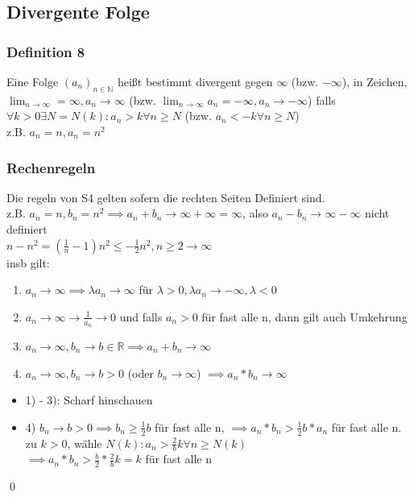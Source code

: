 \documentclass[fleqn]{scrartcl}
\renewenvironment{proof}{{\bfseries Beweis }}{\qed}
\begin{document}
\subsection{Divergente Folge}
\subsubsection{Definition 8} Eine Folge $(a_n)_{n \in \mathbb{N}}$ heißt bestimmt divergent gegen $\infty$ (bzw. $-\infty$), in Zeichen, $\lim_{n\rightarrow \infty} = \infty, a_n \rightarrow \infty$ (bzw. $\lim_{n\rightarrow\infty} a_n = - \infty , a_n \rightarrow - \infty$) falls $\forall k > 0 \exists N = N(k): a_n > k \forall n \geq N$ (bzw. $a_n < -k \forall n \geq N$)\\
z.B. $a_n = n, a_n = n^2$
\subsubsection{Rechenregeln} Die regeln von S4 gelten sofern die rechten Seiten Definiert sind.\\
z.B. $a_n = n, b_n = n^2 \implies a_n + b_n \rightarrow \infty + \infty = \infty$, also $a_n - b_n \rightarrow \infty - \infty$ nicht definiert\\
$n - n^2 = (\frac{1}{n} - 1) n^2 \leq -\frac{1}{2}n^2, n\geq 2 \rightarrow \infty$\\
insb gilt:
\begin{enumerate}[1)]
\item $a_n \rightarrow \infty \implies \lambda a_n \rightarrow \infty$ für $\lambda > 0, \lambda a_n \rightarrow - \infty, \lambda < 0$
\item $a_n \rightarrow \infty \rightarrow \frac{1}{a_n} \rightarrow 0$ und falls $a_n > 0$ für fast alle n, dann gilt auch Umkehrung
\item $a_n \rightarrow \infty, b_n \rightarrow b \in \mathbb{R} \implies a_n + b_n \rightarrow \infty$
\item $a_n \rightarrow \infty, b_n \rightarrow b > 0$ (oder $b_n \rightarrow \infty$) $\implies a_n * b_n \rightarrow \infty$
\end{enumerate}
\begin{proof}
\begin{itemize}
\item 1) - 3): Scharf hinschauen
\item 4) $b_n \rightarrow b > 0 \implies b_n \geq \frac{1}{2} b$ für fast alle n, $\implies a_n * b_n > \frac{1}{2}b*a_n$ für fast alle n.\\zu $k > 0$, wähle $N(k): a_n > \frac{2}{b}k \forall n\geq N(k)$\\$\implies a_n * b_n > \frac{b}{2} * \frac{2}{b} k = k$ für fast alle n
\end{itemize}
\end{proof}
\end{document}
